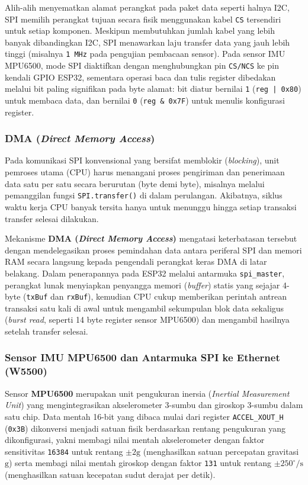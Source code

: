 Alih-alih menyematkan alamat perangkat pada paket data seperti halnya I2C, SPI memilih perangkat tujuan secara fisik menggunakan kabel \texttt{CS} tersendiri untuk setiap komponen. Meskipun membutuhkan jumlah kabel yang lebih banyak dibandingkan I2C, SPI menawarkan laju transfer data yang jauh lebih tinggi (misalnya \texttt{1 MHz} pada pengujian pembacaan sensor). Pada sensor IMU MPU6500, mode SPI diaktifkan dengan menghubungkan pin \texttt{CS/NCS} ke pin kendali GPIO ESP32, sementara operasi baca dan tulis register dibedakan melalui bit paling signifikan pada byte alamat: bit diatur bernilai \texttt{1} (\texttt{reg | 0x80}) untuk membaca data, dan bernilai \texttt{0} (\texttt{reg \& 0x7F}) untuk menulis konfigurasi register.

\subsubsection{DMA (\textit{Direct Memory Access})}
Pada komunikasi SPI konvensional yang bersifat memblokir (\textit{blocking}), unit pemroses utama (CPU) harus menangani proses pengiriman dan penerimaan data satu per satu secara berurutan (byte demi byte), misalnya melalui pemanggilan fungsi \texttt{SPI.transfer()} di dalam perulangan. Akibatnya, siklus waktu kerja CPU banyak tersita hanya untuk menunggu hingga setiap transaksi transfer selesai dilakukan.

Mekanisme \textbf{DMA (\textit{Direct Memory Access})} mengatasi keterbatasan tersebut dengan mendelegasikan proses pemindahan data antara periferal SPI dan memori RAM secara langsung kepada pengendali perangkat keras DMA di latar belakang. Dalam penerapannya pada ESP32 melalui antarmuka \texttt{spi\_master}, perangkat lunak menyiapkan penyangga memori (\textit{buffer}) statis yang sejajar 4-byte (\texttt{txBuf} dan \texttt{rxBuf}), kemudian CPU cukup memberikan perintah antrean transaksi satu kali di awal untuk mengambil sekumpulan blok data sekaligus (\textit{burst read}, seperti 14 byte register sensor MPU6500) dan mengambil hasilnya setelah transfer selesai.

\subsubsection{Sensor IMU MPU6500 dan Antarmuka SPI ke Ethernet (W5500)}
Sensor \textbf{MPU6500} merupakan unit pengukuran inersia (\textit{Inertial Measurement Unit}) yang mengintegrasikan akselerometer 3-sumbu dan giroskop 3-sumbu dalam satu chip. Data mentah 16-bit yang dibaca mulai dari register \texttt{ACCEL\_XOUT\_H} (\texttt{0x3B}) dikonversi menjadi satuan fisik berdasarkan rentang pengukuran yang dikonfigurasi, yakni membagi nilai mentah akselerometer dengan faktor sensitivitas \texttt{16384} untuk rentang $\pm 2\text{g}$ (menghasilkan satuan percepatan gravitasi $\text{g}$) serta membagi nilai mentah giroskop dengan faktor \texttt{131} untuk rentang $\pm 250^\circ/\text{s}$ (menghasilkan satuan kecepatan sudut derajat per detik).

